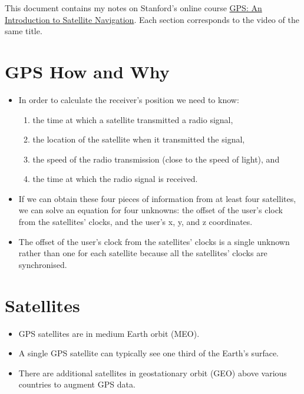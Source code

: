 \documentclass{article}
\begin{document}
This document contains my notes on Stanford's online course \href{https://www.youtube.com/playlist?list=PLGvhNIiu1ubyEOJga50LJMzVXtbUq6CPo}{GPS: An Introduction to Satellite Navigation}. Each section corresponds to the video of the same title.

\tableofcontents

\section{GPS How and Why}

\begin{itemize}
  \item In order to calculate the receiver's position we need to know:

        \begin{enumerate}
          \item the time at which a satellite transmitted a radio signal,

          \item the location of the satellite when it transmitted the signal,

          \item the speed of the radio transmission (close to the speed of light), and

          \item the time at which the radio signal is received.
        \end{enumerate}

  \item If we can obtain these four pieces of information from at least four satellites, we can solve an equation for four unknowns: the offset of the user's clock from the satellites' clocks, and the user's x, y, and z coordinates.

  \item The offset of the user's clock from the satellites' clocks is a single unknown rather than one for each satellite because all the satellites' clocks are synchronised.
\end{itemize}

\section{Satellites}

\begin{itemize}
  \item GPS satellites are in medium Earth orbit (MEO).

  \item A single GPS satellite can typically see one third of the Earth's surface.

  \item There are additional satellites in geostationary orbit (GEO) above various countries to augment GPS data.
\end{itemize}
\end{document}
